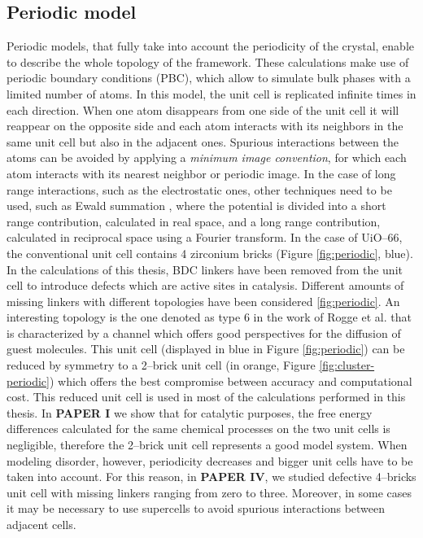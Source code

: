 \subsection*{Periodic model}
Periodic models, that fully take into account the periodicity of the crystal, enable to describe the whole topology of the framework. These calculations make use of periodic boundary conditions (PBC), which allow to simulate bulk phases with a limited number of atoms. In this model, the unit cell is replicated infinite times in each direction. When one atom disappears from one side of the unit cell it will reappear on the opposite side and each atom interacts with its neighbors in the same unit cell but also in the adjacent ones. Spurious interactions between the atoms can be avoided by applying a \textit{minimum image convention}, for which each atom interacts with its nearest neighbor or periodic image. In the case of long range interactions, such as the electrostatic ones, other techniques need to be used, such as Ewald summation \cite{Ewald1921}, where the potential is divided into a short range contribution, calculated in real space, and a long range contribution, calculated in reciprocal space using a Fourier transform. 
\npar
In the case of UiO--66, the conventional unit cell\cite{cavka2008new} contains 4 zirconium bricks (Figure \ref{fig:periodic}, blue). In the calculations of this thesis, BDC linkers have been removed from the unit cell to introduce defects which are active sites in catalysis. Different amounts of missing linkers with different topologies have been considered \ref{fig:periodic}. An interesting topology is the one denoted as type 6 in the work of Rogge et al.\cite{rogge2017metal} that is characterized by a channel which offers good perspectives for the diffusion of guest molecules. This unit cell (displayed in blue in Figure \ref{fig:periodic}) can be reduced by symmetry to a 2--brick unit cell (in orange, Figure \ref{fig:cluster-periodic}) which offers the best compromise between accuracy and computational cost. This reduced unit cell is used in most of the calculations performed in this thesis. In \textbf{PAPER I} we show that for catalytic purposes, the free energy differences calculated for the same chemical processes on the two unit cells is negligible, therefore the 2--brick unit cell represents a good model system. When modeling disorder, however, periodicity decreases and bigger unit cells have to be taken into account. For this reason, in \textbf{PAPER IV}, we studied defective 4--bricks unit cell with missing linkers ranging from zero to three. Moreover, in some cases it may be necessary to use supercells to avoid spurious interactions between adjacent cells.

